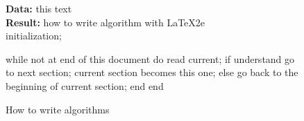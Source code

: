 \documentclass[12pt,a4paper]{report}
\begin{document}
\begin{figure}[h]
\caption{How to write algorithms}
\textbf{Data:} this text\\
\textbf{Result:} how to write algorithm with \LaTeX2e\\
initialization;
\begin{PseudoCode}
while not at end of this document do
    read current;
    if understand
        go to next section;
        current section becomes this one;
    else
        go back to the beginning of current section;
    end
end
\end{PseudoCode}
\end{figure}
\end{document}
